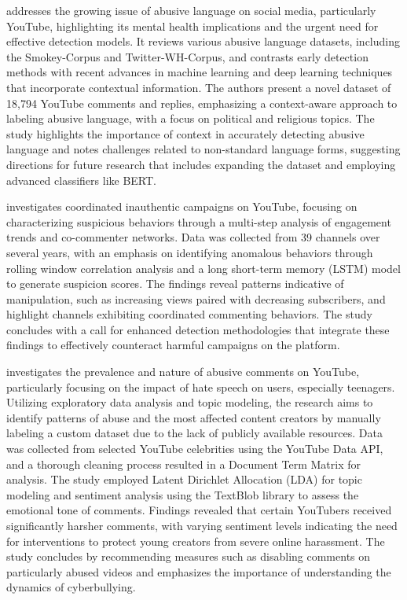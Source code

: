 \documentclass[12pt]{article}
\begin{document}
\cite{ashraf2021abusive} addresses the growing issue of abusive language on social media, 
particularly YouTube, highlighting its mental health implications and the urgent need for 
effective detection models. It reviews various abusive language datasets, including the Smokey-Corpus 
and Twitter-WH-Corpus, and contrasts early detection methods with recent advances in machine 
learning and deep learning techniques that incorporate contextual information. The authors present 
a novel dataset of 18,794 YouTube comments and replies, emphasizing a context-aware approach 
to labeling abusive language, with a focus on political and religious topics. 
The study highlights the importance of context in accurately detecting abusive language 
and notes challenges related to non-standard language forms, suggesting directions for 
future research that includes expanding the dataset and employing advanced classifiers like BERT.


\cite{kirdemir2023} investigates coordinated inauthentic campaigns on YouTube, focusing on 
characterizing suspicious behaviors through a multi-step analysis of engagement trends and co-commenter 
networks.  
Data was collected from 39 channels over several years, with an emphasis on identifying anomalous 
behaviors through rolling window correlation analysis and a long short-term memory (LSTM) model to 
generate suspicion scores. The findings reveal patterns indicative of manipulation, such as increasing 
views paired with decreasing subscribers, and highlight channels exhibiting coordinated 
commenting behaviors. The study concludes with a call for enhanced detection methodologies that 
integrate these findings to effectively counteract harmful campaigns on the platform.


\cite{shekar2021} investigates the prevalence and nature of abusive comments on YouTube, 
particularly focusing on the impact of hate speech on users, especially teenagers. 
Utilizing exploratory data analysis and topic modeling, the research aims to identify patterns of 
abuse and the most affected content creators by manually labeling a custom dataset due to the lack 
of publicly available resources. Data was collected from selected YouTube celebrities using the 
YouTube Data API, and a thorough cleaning process resulted in a Document Term Matrix for analysis. 
The study employed Latent Dirichlet Allocation (LDA) for topic modeling and sentiment analysis using 
the TextBlob library to assess the emotional tone of comments. Findings revealed that certain 
YouTubers received significantly harsher comments, with varying sentiment levels indicating the 
need for interventions to protect young creators from severe online harassment. 
The study concludes by recommending measures such as disabling comments on particularly abused 
videos and emphasizes the importance of understanding the dynamics of cyberbullying.
\end{document}

